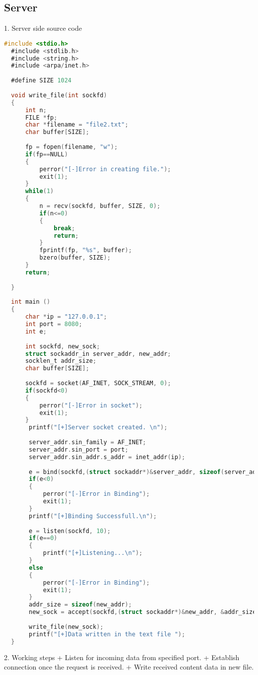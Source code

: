 \documentclass{article}
\begin{document}
\subsection{Server}

1. Server side source code\newline 

\begin{lstlisting}[language=C, caption=Server Code, label=lst:code]
  #include <stdio.h>
  #include <stdlib.h>
  #include <string.h>
  #include <arpa/inet.h>
  
  #define SIZE 1024
  
  void write_file(int sockfd)
  {
      int n; 
      FILE *fp;
      char *filename = "file2.txt";
      char buffer[SIZE];
  
      fp = fopen(filename, "w");
      if(fp==NULL)
      {
          perror("[-]Error in creating file.");
          exit(1);
      }
      while(1)
      {
          n = recv(sockfd, buffer, SIZE, 0);
          if(n<=0)
          {
              break;
              return;
          }
          fprintf(fp, "%s", buffer);
          bzero(buffer, SIZE);
      }
      return;
      
  }
  
  int main ()
  {
      char *ip = "127.0.0.1";
      int port = 8080;
      int e;
  
      int sockfd, new_sock;
      struct sockaddr_in server_addr, new_addr;
      socklen_t addr_size;
      char buffer[SIZE];
  
      sockfd = socket(AF_INET, SOCK_STREAM, 0);
      if(sockfd<0)
      {
          perror("[-]Error in socket");
          exit(1);
      }
       printf("[+]Server socket created. \n");
  
       server_addr.sin_family = AF_INET;
       server_addr.sin_port = port;
       server_addr.sin_addr.s_addr = inet_addr(ip);
  
       e = bind(sockfd,(struct sockaddr*)&server_addr, sizeof(server_addr));
       if(e<0)
       {
           perror("[-]Error in Binding");
           exit(1);
       }
       printf("[+]Binding Successfull.\n");
  
       e = listen(sockfd, 10);
       if(e==0)
       {
           printf("[+]Listening...\n");
       }
       else 
       {
           perror("[-]Error in Binding");
           exit(1);
       }
       addr_size = sizeof(new_addr);
       new_sock = accept(sockfd,(struct sockaddr*)&new_addr, &addr_size);
  
       write_file(new_sock);
       printf("[+]Data written in the text file ");
  }
\end{lstlisting}
2. Working steps\newline 
+ Listen for incoming data from specified port.\newline
+ Establish connection once the request is received.\newline 
+ Write received content data in new file.\newline 
\end{document}
